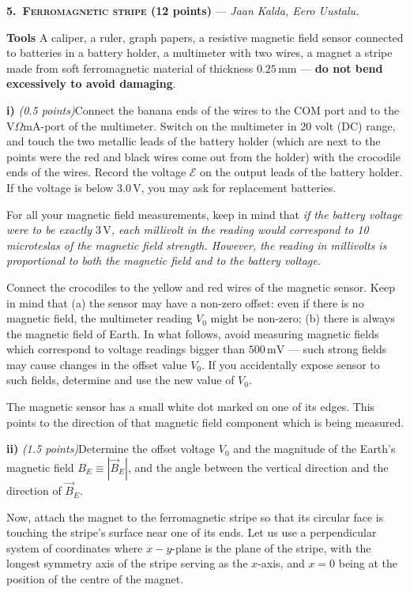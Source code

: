 \textbf{5.\ \textsc{Ferromagnetic stripe} (12 points)} --- \textit{Jaan Kalda, Eero Uustalu.}

\textbf{Tools} A caliper, a ruler, graph papers, a resistive magnetic field
sensor connected to batteries in a battery holder, a multimeter with two wires, a
magnet a stripe made from soft ferromagnetic material of thickness
$0.25\,\mathrm{mm}$ --- \textbf{do not bend excessively to avoid damaging}.

\textbf{i)} \textit{(0.5 points)}Connect the banana ends of the wires to the COM
port and to the V$\Omega$mA-port of the multimeter. Switch on the multimeter in
20 volt (DC) range, and touch the two metallic leads of the battery holder (which
are next to the points were the red and black wires come out from the holder)
with the crocodile ends of the wires. Record the voltage $\mathcal{E}$ on the
output leads of the battery holder. If the voltage is below $3.0\,\mathrm{V}$,
you may ask for replacement batteries.

For all your magnetic field measurements, keep in mind that \textit{if the
battery voltage were to be exactly $3\,\mathrm{V}$, each millivolt in the reading
would correspond to 10 microteslas of the magnetic field strength. However, the
reading in millivolts is proportional to both the magnetic field and to the
battery voltage}.

Connect the crocodiles to the yellow and red wires of the magnetic sensor. Keep
in mind that (a) the sensor may have a non-zero offset: even if there is no
magnetic field, the multimeter reading $V_0$ might be non-zero; (b) there is
always the magnetic field of Earth. In what follows, avoid measuring magnetic
fields which correspond to voltage readings bigger than $500\,\mathrm{mV}$ ---
such strong fields may cause changes in the offset value $V_0$. If you
accidentally expose sensor to such fields, determine and use the new value of
$V_0$.

The magnetic sensor has a small white dot marked on one of its edges. This points
to the direction of that magnetic field component which is being measured.

\textbf{ii)} \textit{(1.5 points)}Determine the offset voltage $V_0$ and the
magnitude of the Earth's magnetic field $B_E \equiv |\vec{B}_E|$, and the angle
between the vertical direction and the direction of $\vec{B}_E$.

Now, attach the magnet to the ferromagnetic stripe so that its circular face is
touching the stripe's surface near one of its ends. Let us use a perpendicular
system of coordinates where $x - y$-plane is the plane of the stripe, with the
longest symmetry axis of the stripe serving as the $x$-axis, and $x = 0$ being
at the position of the centre of the magnet.

